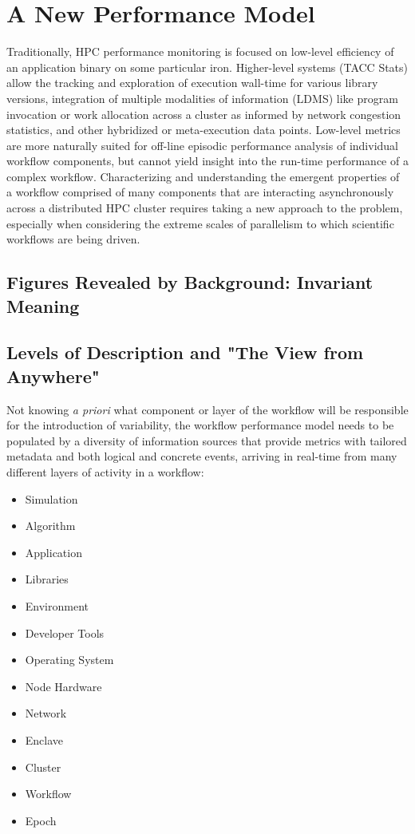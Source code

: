 \section{A New Performance Model}
Traditionally, HPC performance monitoring is focused on low-level
efficiency of an application binary on some particular iron.
Higher-level systems (TACC Stats) allow the tracking and exploration
of execution wall-time for various library versions, integration of
multiple modalities of information (LDMS) like program invocation or
work allocation across a cluster as informed by network congestion
statistics, and other hybridized or meta-execution data points.
Low-level metrics are more naturally suited for off-line episodic
performance analysis of individual workflow components, but cannot
yield insight into the run-time performance of a complex workflow.
Characterizing and understanding the emergent properties of a workflow
comprised of many components that are interacting asynchronously
across a distributed HPC cluster requires taking a new approach to the
problem, especially when considering the extreme scales of parallelism
to which scientific workflows are being driven.

\subsection{Figures Revealed by Background: Invariant Meaning}

\subsection{Levels of Description and "The View from Anywhere"}
Not knowing \textit{a priori} what component or layer of the workflow
will be responsible for the introduction of variability, the workflow
performance model needs to be populated by a diversity of information
sources that provide metrics with tailored metadata and both logical
and concrete events, arriving in real-time from many different layers
of activity in a workflow:

\begin{itemize}
    \item Simulation
    \item Algorithm
    \item Application
    \item Libraries
    \item Environment
    \item Developer Tools
    \item Operating System
    \item Node Hardware
    \item Network
    \item Enclave
    \item Cluster
    \item Workflow
    \item Epoch	
\end{itemize}


